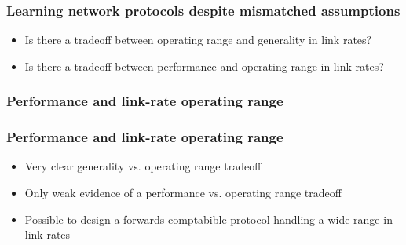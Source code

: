 \begin{frame}
\frametitle{Learning network protocols despite mismatched assumptions}
\begin{itemize}
\item<2-> Is there a tradeoff between operating range and generality in link rates?
\item<3-> Is there a tradeoff between performance and operating range in link rates?
\end{itemize}
\end{frame}


\begin{frame}
\frametitle{Performance and link-rate operating range}
\begin{centering}

\noindent {}

\end{centering}
\end{frame}

\begin{frame}
\frametitle{Performance and link-rate operating range}
\begin{itemize}
\item <2->{Very clear generality vs. operating range tradeoff}
\item <3->{Only weak evidence of a performance vs. operating range tradeoff}
\item <4->{Possible to design a forwards-comptabible protocol handling a wide range in link rates}
\end{itemize}
\end{frame}
